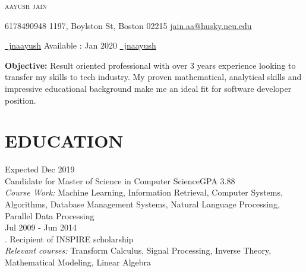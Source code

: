 \documentclass[letterpaper, 10pt, oneside]{article}
\newcommand{\sectionspace}{\vspace{-1em}}
\begin{document}
\vspace{-0.5em}
\begin{center}
\color{headings}\textsc{\Huge{{aayush jain}}} \\
\vspace{0.0em}
\raggedright \color{text1}{\Large\Telefon} 6178490948 
\hspace{13.8em}1197, Boylston St, Boston 02215 \hspace{8.6em} {\Large\Letter} \href{mailto:jain.aa@husky.neu.edu}{jain.aa@husky.neu.edu} 

\vspace{-0.0em}
\raggedright
{\Large\faGithub} \href{https://github.com/jnaayush}{\ jnaayush}
\hspace{16.5em} {\selectfont Available : Jan 2020}  
\hspace{11.8em}  {\Large\faLinkedin} \href{https://www.linkedin.com/in/jnaayush}{\ jnaayush}

\vspace{0.5 em}
\textbf{Objective: }Result oriented professional with over 3 years experience looking to transfer my skills to tech industry. My proven mathematical, analytical skills and impressive educational background make me an ideal fit for software developer position.

\sectionspace
\section{\color{headings}\large\textbf{EDUCATION}}
\vspace{-0.5em}
 \hfill {Expected Dec 2019}\\
Candidate for Master of Science in Computer Science\hfill {GPA 3.88}\\
\textit{Course Work:} Machine Learning, Information Retrieval, Computer Systems, Algorithms, Database Management Systems, Natural Language Processing, Parallel Data Processing \\
\vspace{0.5em}
 \hfill {Jul 2009 - Jun 2014}\\
\color{text1}{Bachelors (Honors)  \& Masters (Honors) of Science in Exploration Geophysics}. Recipient of INSPIRE scholarship\\ 
\textit{Relevant courses:} Transform Calculus, Signal Processing, Inverse Theory, Mathematical Modeling, Linear Algebra
\end{center}
\end{document}
